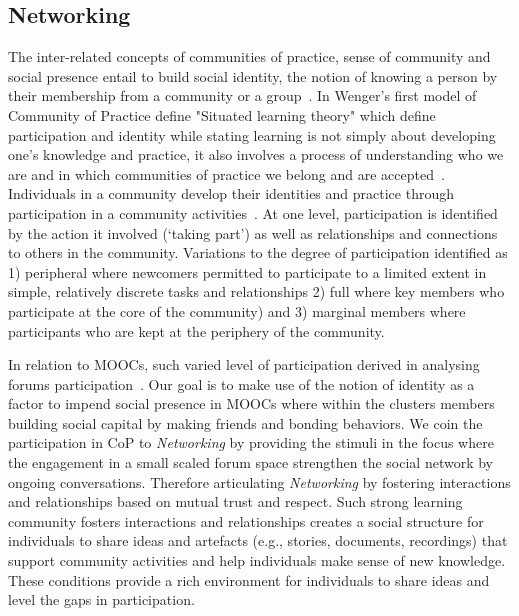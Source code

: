 \documentclass[format=acmsmall, review=false, screen=true]{acmart}
\begin{document}
\subsection{Networking} 
The inter-related concepts of communities of practice, sense of community and social presence entail to build social identity, the notion of knowing a person by their membership from a community or a group~\cite{wenger1999communities}. In Wenger's first model of Community of Practice define "Situated learning theory" which define participation and identity while stating learning is not simply
about developing one's knowledge and practice, it also involves a process of understanding who we are and in which communities of practice we belong and are accepted~\cite{wenger1999communities}. Individuals in a community develop their identities and practice through participation in a community activities~\cite{handley2006within}. At one level, participation is identified by the action it involved (‘taking part’) as well as
relationships and connections to others in the community. Variations to the degree of participation identified as 1) peripheral where newcomers permitted to participate to a limited extent in simple, relatively discrete tasks and relationships 2) full where key members who participate at the core of the community) and 3) marginal members where participants who are kept at the periphery of the community. 

In relation to MOOCs, such varied level of participation derived in analysing forums participation~\cite{rodrigues2016discovering,ferguson2012social}. Our goal is to make use of the notion of identity as a factor to impend social presence in MOOCs where within the clusters members building social capital by making friends and bonding behaviors. We coin the participation in CoP to \textit{Networking} by providing the stimuli in the focus where the engagement in a small scaled forum space strengthen the social network by ongoing conversations. Therefore articulating \textit{Networking} by fostering interactions and relationships based on mutual trust and respect. Such strong learning community fosters interactions and relationships creates a social structure for individuals to share ideas and artefacts (e.g., stories, documents, recordings) that support community activities and help individuals make sense of new knowledge. These conditions provide a rich environment for individuals to share ideas and level the gaps in participation.
\end{document}
